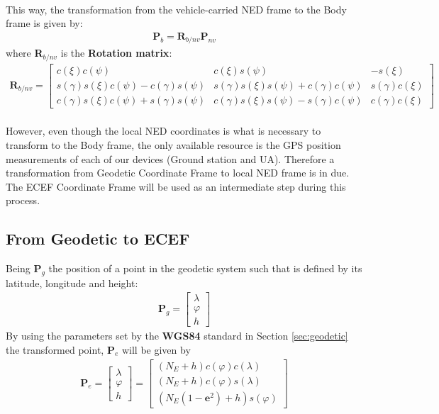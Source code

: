 \paragraph{} This way, the transformation from the vehicle-carried NED frame to the Body frame is given by:
\begin{align}
\textbf{P}_{b} = \textbf{R}_{b/nv}\textbf{P}_{nv}
\end{align}
where \textbf{R}$_{b/nv}$ is the \textbf{Rotation matrix}:
\begin{align*}
\textbf{R}_{b/nv} =
\begin{bmatrix}
c(\xi)c(\psi) & c(\xi)s(\psi) & -s(\xi)\\
s(\gamma)s(\xi)c(\psi) - c(\gamma)s(\psi) & s(\gamma)s(\xi)s(\psi) + c(\gamma)c(\psi) & s(\gamma)c(\xi)\\
c(\gamma)s(\xi)c(\psi) + s(\gamma)s(\psi) & c(\gamma)s(\xi)s(\psi) - s(\gamma)c(\psi) & c(\gamma)c(\xi)
\end{bmatrix}
\end{align*}

\paragraph{} However, even though the local NED coordinates is what is necessary to transform to the Body frame, the only available resource  is the GPS position measurements of each of our devices (Ground station and UA). Therefore a transformation from Geodetic Coordinate Frame to local NED frame is in due. The ECEF Coordinate Frame will be used as an intermediate step during this process.

\subsection*{From Geodetic to ECEF}
Being \textbf{P}$_{g}$ the position of a point in the geodetic system such that is defined by its latitude, longitude and height:
\begin{align}
\textbf{P}_{g} = 
\begin{bmatrix}
\lambda \\
\varphi\\
h
\end{bmatrix}
\end{align}
By using the parameters set by the \textbf{WGS84} standard in Section \ref{sec:geodetic} the transformed point, \textbf{P}$_{e}$ will be given by
\begin{align}
\textbf{P}_{e} = 
\begin{bmatrix}
\lambda \\
\varphi\\
h
\end{bmatrix}
=
\begin{bmatrix}
(N_{E}+h)c(\varphi)c(\lambda) \\
(N_{E}+h)c(\varphi)s(\lambda) \\
(N_{E}(1-\textbf{e}^2)+h)s(\varphi)
\end{bmatrix}
\end{align}

